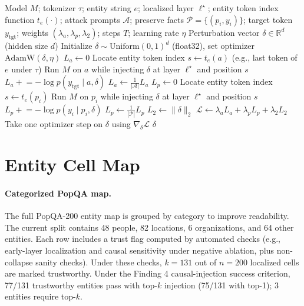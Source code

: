 \documentclass[10pt,twocolumn]{article}
\begin{document}
\begin{algorithm}[!h]
\caption{Factual modification via latent steering at a localized entity layer}
\label{alg:steer}
\begin{algorithmic}[1]
\Require Model $M$; tokenizer $\tau$; entity string $e$; localized layer $\ell^\star$; entity token index function $t_e(\cdot)$; attack prompts $\mathcal{A}$; preserve facts $\mathcal{P}=\{(p_i, y_i)\}$; target token $y_{\mathrm{tgt}}$; weights $(\lambda_a,\lambda_p,\lambda_2)$; steps $T$; learning rate $\eta$
\Ensure Perturbation vector $\delta \in \mathbb{R}^{d}$ (hidden size $d$)
\State Initialize $\delta \sim \mathrm{Uniform}(0,1)^d$ (float32), set optimizer $\mathrm{AdamW}(\delta,\eta)$
\State $L_a \gets 0$
\State Locate entity token index $s \gets t_e(a)$ (e.g., last token of $e$ under $\tau$)
\State Run $M$ on $a$ while injecting $\delta$ at layer $\ell^\star$ and position $s$
\State $L_a \mathrel{+}= -\log p(y_{\mathrm{tgt}} \mid a, \delta)$
\EndFor
\State $L_a \gets \frac{1}{|\mathcal{A}|} L_a$
\State $L_p \gets 0$
\State Locate entity token index $s \gets t_e(p_i)$
\State Run $M$ on $p_i$ while injecting $\delta$ at layer $\ell^\star$ and position $s$
\State $L_p \mathrel{+}= -\log p(y_i \mid p_i, \delta)$
\EndFor
\State $L_p \gets \frac{1}{|\mathcal{P}|} L_p$
\State $L_2 \gets \|\delta\|_2$
\State $\mathcal{L} \gets \lambda_a L_a + \lambda_p L_p + \lambda_2 L_2$
\State Take one optimizer step on $\delta$ using $\nabla_\delta \mathcal{L}$
\EndFor
\State \Return $\delta$
\end{algorithmic}
\end{algorithm}

\clearpage
\section{Entity Cell Map}
\label{app:entity_neurons}

\paragraph{Categorized PopQA map.}
The full PopQA-200 entity map is grouped by category to improve readability. The current split contains 48 people, 82 locations, 6 organizations, and 64 other entities. Each row includes a trust flag computed by automated checks (e.g., early-layer localization and causal sensitivity under negative ablation, plus non-collapse sanity checks). Under these checks, $k=131$ out of $n=200$ localized cells are marked trustworthy. Under the Finding 4 causal-injection success criterion, 77/131 trustworthy entities pass with top-$k$ injection (75/131 with top-1); 3 entities require top-$k$.

\end{document}
